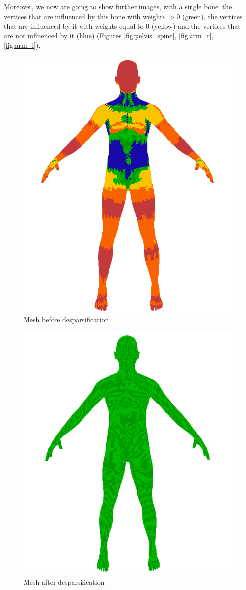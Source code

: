 \documentclass[12pt,twoside]{report}
\begin{document}
Moreover, we now are going to show further images, with a single bone: the vertices that are influenced by this bone with weights $>0$ (green), the vertices that are influenced by it with weights equal to $0$ (yellow) and the vertices that are not influenced by it (blue) (Figures \ref{fig:pelvis_spine}, \ref{fig:arm_r}, \ref{fig:arm_l}).

\begin{figure}[hp]
    \centering
    \includegraphics[width=50ex]{graphics/bfDesparse.png}
    \caption{Mesh before desparsification}
    \label{fig:beforeDesparse}
\end{figure}

\begin{figure}[hp]
\centering
\includegraphics[width=50ex]{graphics/aftDesparse.png}
\caption{Mesh after desparsification}
\label{fig:afterDesparse}
\end{figure}
\end{document}
